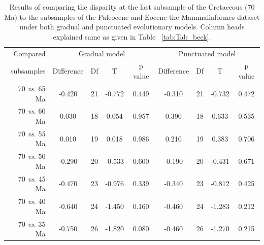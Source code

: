 \documentclass[12pt,letterpaper]{article}
\begin{document}
\begin{table}[ht]
\caption{Results of comparing the disparity at the last subsample of the Cretaceous (70 Ma) to the subsamples of the Paleocene and Eocene the Mammaliaformes dataset under both gradual and punctuated evolutionary models. Column heads explained same as given in Table ~\ref{tab:Tab_beck}.}
\label{tab:Tab_slater}
\centering
\begin{tabular}{r|cccc|cccc}
  \hline
  Compared & \multicolumn{4}{c|}{Gradual model} & \multicolumn{4}{c}{Punctuated model} \\
  subsamples & Difference & Df & T & p value & Difference & Df & T & p value \\ 
  \hline
  70 \textit{vs.} 65 Ma & -0.420 & 21 & -0.772 & 0.449 & -0.310 & 21 & -0.732 & 0.472 \\ 
  70 \textit{vs.} 60 Ma & 0.030 & 18 & 0.054 & 0.957 & 0.390 & 18 & 0.633 & 0.535 \\ 
  70 \textit{vs.} 55 Ma & 0.010 & 19 & 0.018 & 0.986 & 0.210 & 19 & 0.383 & 0.706 \\ 
  70 \textit{vs.} 50 Ma & -0.290 & 20 & -0.533 & 0.600 & -0.190 & 20 & -0.431 & 0.671 \\ 
  70 \textit{vs.} 45 Ma & -0.470 & 23 & -0.976 & 0.339 & -0.340 & 23 & -0.812 & 0.425 \\ 
  70 \textit{vs.} 40 Ma & -0.640 & 24 & -1.450 & 0.160 & -0.460 & 24 & -1.283 & 0.212 \\ 
  70 \textit{vs.} 35 Ma & -0.750 & 26 & -1.820 & 0.080 & -0.460 & 26 & -1.270 & 0.215 \\ 
   \hline
\end{tabular}
\end{table}

\end{document}

